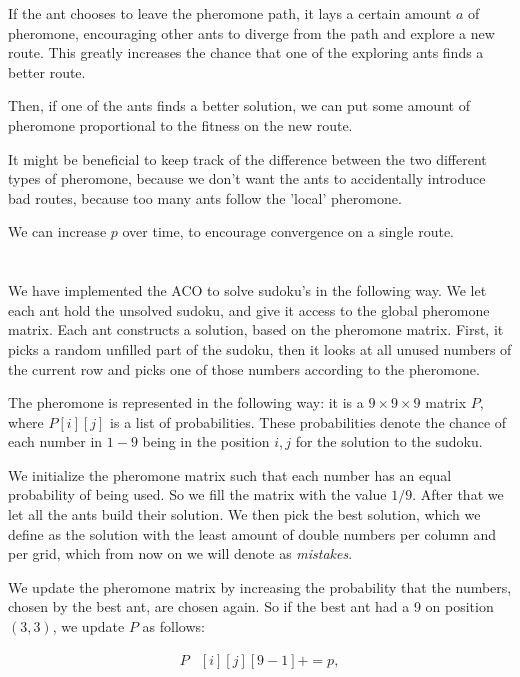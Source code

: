 \documentclass[11pt]{article}
\begin{document}
If the ant chooses to leave the pheromone path, it lays a certain amount $a$ of pheromone, encouraging other ants to diverge from the path and explore a new route. This greatly increases the chance that one of the exploring ants finds a better route.

Then, if one of the ants finds a better solution, we can put some amount of pheromone proportional to the fitness on the new route.

It might be beneficial to keep track of the difference between the two different types of pheromone, because we don't want the ants to accidentally introduce bad routes, because too many ants follow the 'local' pheromone.

We can increase $p$ over time, to encourage convergence on a single route. 


\section{}


We have implemented the ACO to solve sudoku's in the following way. We let each ant hold the unsolved sudoku, and give it access to the global pheromone matrix. Each ant constructs a solution, based on the pheromone matrix. First, it picks a random unfilled part of the sudoku, then it looks at all unused numbers of the current row and picks one of those numbers according to the pheromone.

The pheromone is represented in the following way: it is a $9\times9\times9$ matrix $P$, where $P[i][j]$ is a list of probabilities. These probabilities denote the chance of each number in $1-9$ being in the position $i,j$ for the solution to the sudoku.

We initialize the pheromone matrix such that each number has an equal probability of being used. So we fill the matrix with the value $1/9$. After that we let all the ants build their solution. We then pick the best solution, which we define as the solution with the least amount of double numbers per column and per grid, which from now on we will denote as \textit{mistakes}. 

We update the pheromone matrix by increasing the probability that the numbers, chosen by the best ant, are chosen again. So if the best ant had a 9 on position $(3,3)$, we update $P$ as follows:

\begin{align*}
	P&[i][j][9-1] += p, \\
\end{align*}
\end{document}
